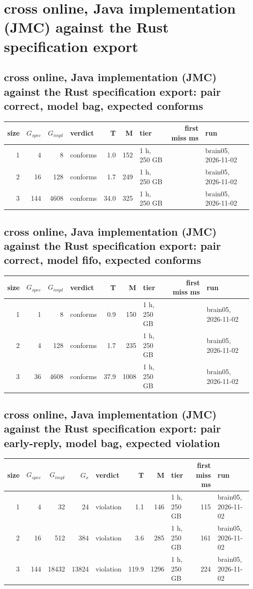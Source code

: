 \documentclass[10pt]{article}
\begin{document}
\section*{cross online, Java implementation (JMC) against the Rust specification export}
\subsection*{cross online, Java implementation (JMC) against the Rust specification export: pair \textsf{correct}, model bag, expected conforms}
\begin{longtable}{@{}rrrlrrlrl@{}}
\toprule
size & $G_{\mathit{spec}}$ & $G_{\mathit{impl}}$ & verdict & T & M & tier & first miss ms & run \\
\midrule
\endhead
\color{red} 1 & 4 & 8 & conforms & 1.0 & 152 & 1 h, 250 GB &  & brain05, 2026-11-02 \\
\color{red} 2 & 16 & 128 & conforms & 1.7 & 249 & 1 h, 250 GB &  & brain05, 2026-11-02 \\
\color{red} 3 & 144 & 4608 & conforms & 34.0 & 325 & 1 h, 250 GB &  & brain05, 2026-11-02 \\
\bottomrule
\end{longtable}
\subsection*{cross online, Java implementation (JMC) against the Rust specification export: pair \textsf{correct}, model fifo, expected conforms}
\begin{longtable}{@{}rrrlrrlrl@{}}
\toprule
size & $G_{\mathit{spec}}$ & $G_{\mathit{impl}}$ & verdict & T & M & tier & first miss ms & run \\
\midrule
\endhead
\color{red} 1 & 1 & 8 & conforms & 0.9 & 150 & 1 h, 250 GB &  & brain05, 2026-11-02 \\
\color{red} 2 & 4 & 128 & conforms & 1.7 & 235 & 1 h, 250 GB &  & brain05, 2026-11-02 \\
\color{red} 3 & 36 & 4608 & conforms & 37.9 & 1008 & 1 h, 250 GB &  & brain05, 2026-11-02 \\
\bottomrule
\end{longtable}
\subsection*{cross online, Java implementation (JMC) against the Rust specification export: pair \textsf{early-reply}, model bag, expected violation}
\begin{longtable}{@{}rrrrlrrlrl@{}}
\toprule
size & $G_{\mathit{spec}}$ & $G_{\mathit{impl}}$ & $G_x$ & verdict & T & M & tier & first miss ms & run \\
\midrule
\endhead
\color{red} 1 & 4 & 32 & 24 & violation & 1.1 & 146 & 1 h, 250 GB & 115 & brain05, 2026-11-02 \\
\color{red} 2 & 16 & 512 & 384 & violation & 3.6 & 285 & 1 h, 250 GB & 161 & brain05, 2026-11-02 \\
\color{red} 3 & 144 & 18432 & 13824 & violation & 119.9 & 1296 & 1 h, 250 GB & 224 & brain05, 2026-11-02 \\
\bottomrule
\end{longtable}
\end{document}
